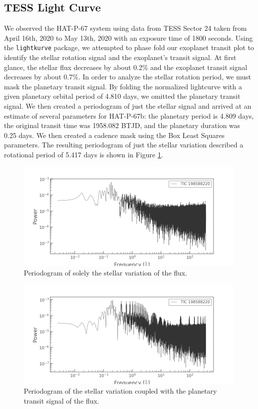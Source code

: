 \documentclass[modern]{aastex631}
\begin{document}
\subsection{TESS Light Curve}
We observed the HAT-P-67 system using data from TESS Sector 24 taken from April 16th, 2020 to May 13th, 2020 with an exposure time of 1800 seconds. Using the \texttt{lightkurve} package, we attempted to phase fold our exoplanet transit plot to identify the stellar rotation signal and the exoplanet's transit signal. At first glance, the stellar flux decreases by about 0.2\% and the exoplanet transit signal decreases by about 0.7\%. In order to analyze the stellar rotation period, we must mask the planetary transit signal. By folding the normalized lightcurve with a given planetary orbital period of 4.810 days, we omitted the planetary transit signal. We then created a periodogram of just the stellar signal and arrived at an estimate of several parameters for HAT-P-67b: the planetary period is 4.809 days, the original transit time was 1958.082 BTJD, and the planetary duration was 0.25 days. We then created a cadence mask using the Box Least Squares parameters. The resulting periodogram of just the stellar variation described a rotational period of 5.417 days is shown in Figure \ref{fig:stellar_periodogram}.

\begin{figure}
    \includegraphics[width=\linewidth]{figures/stellar_periodogram.png}
    \caption{Periodogram of solely the stellar variation of the flux. }
    \label{fig:stellar_periodogram}
\end{figure}

\begin{figure}
    \includegraphics[width=\linewidth]{figures/planetary_periodogram.png}
    \caption{Periodogram of the stellar variation coupled with the planetary transit signal of the flux. }
    \label{fig:planetary_periodogram}
\end{figure}
\end{document}
